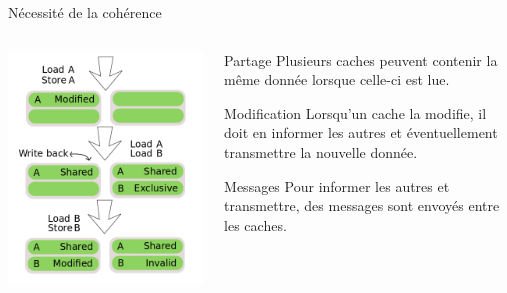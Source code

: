 \begin{frame}{Nécessité de la cohérence}
 \begin{columns}[T]
    \begin{column}{.4\textwidth}
    \includegraphics[scale=.3]{images/learn_mesi_2.png} 
    \end{column}
    \begin{column}{.6\textwidth}
      \begin{block}{Partage}
        Plusieurs caches peuvent contenir la même donnée lorsque celle-ci est lue.
      \end{block}
      \begin{block}{Modification}
        Lorsqu'un cache la modifie, il doit en informer les autres et éventuellement transmettre la nouvelle donnée.
      \end{block}
      \begin{block}{Messages}
        Pour informer les autres et transmettre, des messages sont envoyés entre les caches.
      \end{block}
    \end{column}
 \end{columns}
\end{frame}

